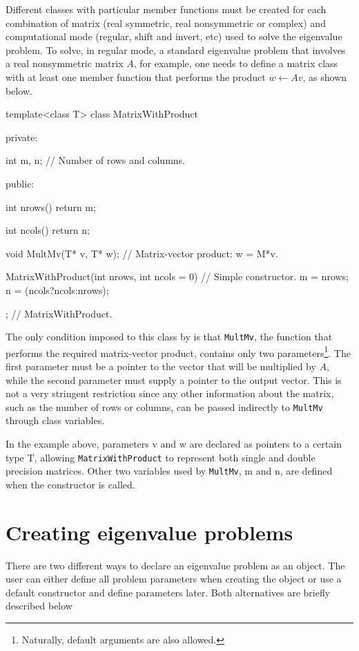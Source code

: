 Different classes with particular member functions must be created for each combination of matrix (real symmetric, real nonsymmetric or complex) and computational mode (regular, shift and invert, etc) used to solve the eigenvalue problem. To solve, in regular mode, a standard eigenvalue problem that involves a real nonsymmetric matrix $A$, for example, one needs to define a matrix class with at least one member function that performs the product $w \leftarrow Av$, as shown below.

\begin{cppcode}
template<class T>
class MatrixWithProduct {
	private:

	int m, n;   // Number of rows and columns.

	public:

	int nrows() { return m; }

	int ncols() { return n; }

	void MultMv(T* v, T* w);   // Matrix-vector product: w = M*v.

	MatrixWithProduct(int nrows, int ncols = 0) // Simple constructor.
	{
		m = nrows;
		n = (ncols?ncols:nrows);
	} 
}; // MatrixWithProduct.
\end{cppcode}

The only condition imposed to this class by \ARPP{} is that \texttt{MultMv}, the function that performs the required matrix-vector product, contains only two parameters\footnote{Naturally, default arguments are also allowed.}. The first parameter must be a pointer to the vector that will be multiplied by $A$, while the second parameter must supply a pointer to the output vector. This is not a very stringent restriction since any other information about the matrix, such as the number of rows or columns, can be passed indirectly to \texttt{MultMv} through class variables.

In the example above, parameters v and w are declared as pointers to a certain type T, allowing \texttt{MatrixWithProduct} to represent both single and double precision matrices. Other two variables used by \texttt{MultMv}, m and n, are defined when the constructor is called.

\section{Creating eigenvalue problems}

There are two different ways to declare an eigenvalue problem as an \ARPP{} object. The user can either define all problem parameters when creating the object or use a default constructor and define parameters later. Both alternatives are briefly described below


